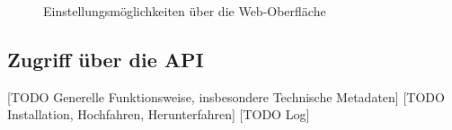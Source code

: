 \begin{figure}
\centering
{}
\qquad
{}
\caption{Einstellungsmöglichkeiten über die Web-Oberfläche}
\label{schlenke:fig:webuiConfig}
\end{figure}

\subsection{Zugriff über die API}

[TODO Generelle Funktionsweise, insbesondere Technische Metadaten]
[TODO Installation, Hochfahren, Herunterfahren]
[TODO Log]


